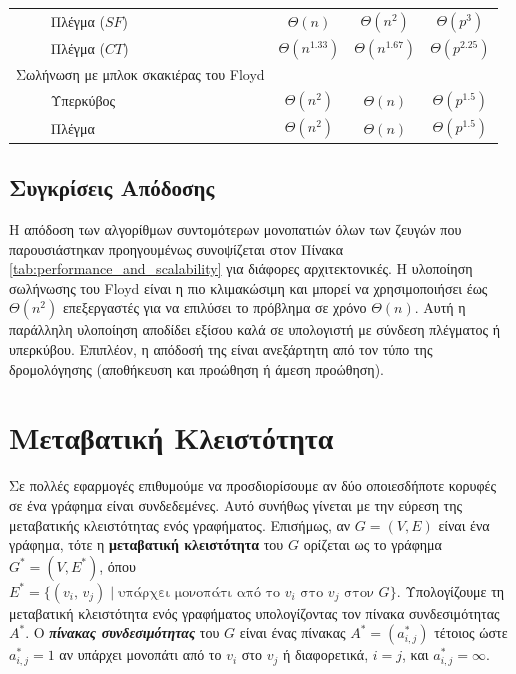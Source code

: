 \documentclass[12pt,a4paper]{article} %
\begin{document}
{{\begin{table}[h]
{\begin{tabular}{llccc}
& Πλέγμα ($SF$) & $\Theta(n)$            & $\Theta(n^2)$        & $\Theta(p^3)$ \\
& Πλέγμα ($CT$) & $\Theta(n^{1.33})$     & $\Theta(n^{1.67})$   & $\Theta(p^{2.25})$ \\
\multicolumn{2}{l}{Σωλήνωση με μπλοκ σκακιέρας του Floyd} & & & \\
& Υπερκύβος & $\Theta(n^2)$ & $\Theta(n)$ & $\Theta(p^{1.5})$ \\
& Πλέγμα      & $\Theta(n^2)$ & $\Theta(n)$ & $\Theta(p^{1.5})$ \\
\hline\hline
\end{tabular}}
\end{table}

\subsection{Συγκρίσεις Απόδοσης}

Η απόδοση των αλγορίθμων συντομότερων μονοπατιών όλων των ζευγών που παρουσιάστηκαν προηγουμένως συνοψίζεται στον Πίνακα \ref{tab:performance_and_scalability} για διάφορες αρχιτεκτονικές. Η υλοποίηση σωλήνωσης του Floyd είναι η πιο κλιμακώσιμη και μπορεί να χρησιμοποιήσει έως $\Theta(n^2)$ επεξεργαστές για να επιλύσει το πρόβλημα σε χρόνο $\Theta(n)$. Αυτή η παράλληλη υλοποίηση αποδίδει εξίσου καλά σε υπολογιστή με σύνδεση πλέγματος ή υπερκύβου. Επιπλέον, η απόδοσή της είναι ανεξάρτητη από τον τύπο της δρομολόγησης (αποθήκευση και προώθηση ή άμεση προώθηση).
\vspace{0.3cm}
\section{Μεταβατική Κλειστότητα}

Σε πολλές εφαρμογές επιθυμούμε να προσδιορίσουμε αν δύο οποιεσδήποτε
κορυφές σε ένα γράφημα είναι συνδεδεμένες. Αυτό συνήθως γίνεται με την
εύρεση της μεταβατικής κλειστότητας ενός γραφήματος. Επισήμως, αν
$G = (V, E)$ είναι ένα γράφημα, τότε η \textbf{μεταβατική κλειστότητα}
του $G$ ορίζεται ως το γράφημα $G^* = (V, E^*)$, όπου
$E^* = \{(v_i,\, v_j) \mid \text{υπάρχει μονοπάτι από το } v_i
\text{ στο } v_j \text{ στον } G\}$.
Υπολογίζουμε τη μεταβατική κλειστότητα ενός γραφήματος υπολογίζοντας τον πίνακα συνδεσιμότητας $A^*$. Ο
\textbf{\textit{πίνακας συνδεσιμότητας}} του $G$ είναι ένας πίνακας
$A^* = (a^*_{i,j})$ τέτοιος ώστε $a^*_{i,j} = 1$ αν υπάρχει μονοπάτι
από το $v_i$ στο $v_j$ ή διαφορετικά, $i = j$, και $a^*_{i,j} = \infty$.

}}
\end{document}
